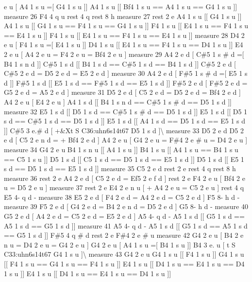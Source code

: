 e u \mbox{[} A4 1 s u =\mbox{[} G4 1 s u \mbox{]}\mbox{]} A4 1 s u \mbox{[}\mbox{[} Bf4 1 s u == A4 1 s u == G4 1 s u \mbox{]}\mbox{]} measure 26 F4 4 q u rest 4 q rest 8 h measure 27 rest 2 e A4 1 s u \mbox{[}\mbox{[} G4 1 s u \mbox{]}\mbox{]} A4 1 s u \mbox{[}\mbox{[} G4 1 s u == F4 1 s u == G4 1 s u \mbox{]}\mbox{]} F4 1 s u \mbox{[}\mbox{[} E4 1 s u == F4 1 s u == E4 1 s u \mbox{]}\mbox{]} F4 1 s u \mbox{[}\mbox{[} E4 1 s u == F4 1 s u == E4 1 s u \mbox{]}\mbox{]} measure 28 D4 2 e u \mbox{[} F4 1 s u =\mbox{[} E4 1 s u \mbox{]}\mbox{]} D4 1 s u \mbox{[}\mbox{[} E4 1 s u == F4 1 s u == D4 1 s u \mbox{]}\mbox{]} E4 2 e u \mbox{[} A4 2 e u = F4 2 e u = Bf4 2 e u \mbox{]} measure 29 A4 2 e d \mbox{[} C\#5 1 s \# d =\mbox{[} B4 1 s n d \mbox{]}\mbox{]} C\#5 1 s d \mbox{[}\mbox{[} B4 1 s d == C\#5 1 s d == B4 1 s d \mbox{]}\mbox{]} C\#5 2 e d \mbox{[} C\#5 2 e d = D5 2 e d = E5 2 e d \mbox{]} measure 30 A4 2 e d \mbox{[} F\#5 1 s \# d =\mbox{[} E5 1 s d \mbox{]}\mbox{]} F\#5 1 s d \mbox{[}\mbox{[} E5 1 s d == F\#5 1 s d == E5 1 s d \mbox{]}\mbox{]} F\#5 2 e d \mbox{[} F\#5 2 e d = G5 2 e d = A5 2 e d \mbox{]} measure 31 D5 2 e d \mbox{[} C5 2 e d = D5 2 e d = Bf4 2 e d \mbox{]} A4 2 e u \mbox{[} E4 2 e u \mbox{]} A4 1 s d \mbox{[}\mbox{[} B4 1 s n d == C\#5 1 s \# d == D5 1 s d \mbox{]}\mbox{]} measure 32 E5 1 s d \mbox{[}\mbox{[} D5 1 s d == C\#5 1 s \# d == D5 1 s d \mbox{]}\mbox{]} E5 1 s d \mbox{[}\mbox{[} D5 1 s d == C\#5 1 s d == D5 1 s d \mbox{]}\mbox{]} E5 1 s d \mbox{[}\mbox{[} A4 1 s d == D5 1 s d == E5 1 s d \mbox{]}\mbox{]} C\#5 3 e.\# d \mbox{[} +\&Xt S C36\+:uhn6s14t67 D5 1 s d \mbox{]}\textbackslash{} measure 33 D5 2 e d D5 2 e d \mbox{[} C5 2 e n d = + Bf4 2 e d \mbox{]} A4 2 e u \mbox{[} G4 2 e u = F\#4 2 e \# u = D4 2 e u \mbox{]} measure 34 G4 2 e u B4 1 s n u \mbox{[}\mbox{[} A4 1 s u \mbox{]}\mbox{]} B4 1 s u \mbox{[}\mbox{[} A4 1 s u == B4 1 s u == C5 1 s u \mbox{]}\mbox{]} D5 1 s d \mbox{[}\mbox{[} C5 1 s d == D5 1 s d == E5 1 s d \mbox{]}\mbox{]} D5 1 s d \mbox{[}\mbox{[} E5 1 s d == D5 1 s d == E5 1 s d \mbox{]}\mbox{]} measure 35 C5 2 e d rest 2 e rest 4 q rest 8 h measure 36 rest 2 e A4 2 e d \mbox{[} C5 2 e d = Ef5 2 e f d \mbox{]} rest 2 e F4 2 e u \mbox{[} Bf4 2 e u = D5 2 e u \mbox{]} measure 37 rest 2 e E4 2 e n u \mbox{[} + A4 2 e u = C5 2 e u \mbox{]} rest 4 q E5 4-\/ q d -\/ measure 38 E5 2 e d \mbox{[} F4 2 e d = A4 2 e d = C5 2 e d \mbox{]} F5 8-\/ h d -\/ measure 39 F5 2 e d \mbox{[} G4 2 e d = B4 2 e n d = D5 2 e d \mbox{]} G5 8-\/ h d -\/ measure 40 G5 2 e d \mbox{[} A4 2 e d = C5 2 e d = E5 2 e d \mbox{]} A5 4-\/ q d -\/ A5 1 s d \mbox{[}\mbox{[} G5 1 s d == A5 1 s d == G5 1 s d \mbox{]}\mbox{]} measure 41 A5 4-\/ q d -\/ A5 1 s d \mbox{[}\mbox{[} G5 1 s d == A5 1 s d == G5 1 s d \mbox{]}\mbox{]} F\#5 4 q \# d rest 2 e F\#4 2 e \# u measure 42 G4 2 e u \mbox{[} B4 2 e n u = D4 2 e u = G4 2 e u \mbox{]} G4 2 e u \mbox{[} A4 1 s u =\mbox{[} B4 1 s u \mbox{]}\mbox{]} B4 3 e. u \mbox{[} t S C33\+:uhn6s14t67 G4 1 s u \mbox{]}\textbackslash{} measure 43 G4 2 e u G4 1 s u \mbox{[}\mbox{[} F4 1 s u \mbox{]}\mbox{]} G4 1 s u \mbox{[}\mbox{[} F4 1 s u == G4 1 s u == F4 1 s u \mbox{]}\mbox{]} E4 1 s u \mbox{[}\mbox{[} D4 1 s u == E4 1 s u == D4 1 s u \mbox{]}\mbox{]} E4 1 s u \mbox{[}\mbox{[} D4 1 s u == E4 1 s u == D4 1 s u \mbox{]}\mbox{]} 